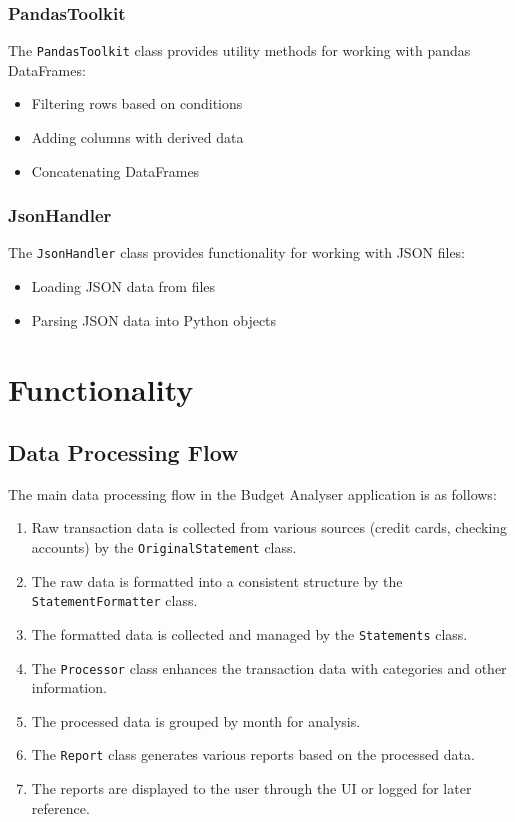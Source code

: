 \documentclass[11pt,a4paper]{report}
\begin{document}
\subsection{PandasToolkit}
The \texttt{PandasToolkit} class provides utility methods for working with pandas DataFrames:
\begin{itemize}
    \item Filtering rows based on conditions
    \item Adding columns with derived data
    \item Concatenating DataFrames
\end{itemize}

\subsection{JsonHandler}
The \texttt{JsonHandler} class provides functionality for working with JSON files:
\begin{itemize}
    \item Loading JSON data from files
    \item Parsing JSON data into Python objects
\end{itemize}

\chapter{Functionality}

\section{Data Processing Flow}
The main data processing flow in the Budget Analyser application is as follows:

\begin{enumerate}
    \item Raw transaction data is collected from various sources (credit cards, checking accounts) by the \texttt{OriginalStatement} class.
    \item The raw data is formatted into a consistent structure by the \texttt{StatementFormatter} class.
    \item The formatted data is collected and managed by the \texttt{Statements} class.
    \item The \texttt{Processor} class enhances the transaction data with categories and other information.
    \item The processed data is grouped by month for analysis.
    \item The \texttt{Report} class generates various reports based on the processed data.
    \item The reports are displayed to the user through the UI or logged for later reference.
\end{enumerate}
\end{document}
